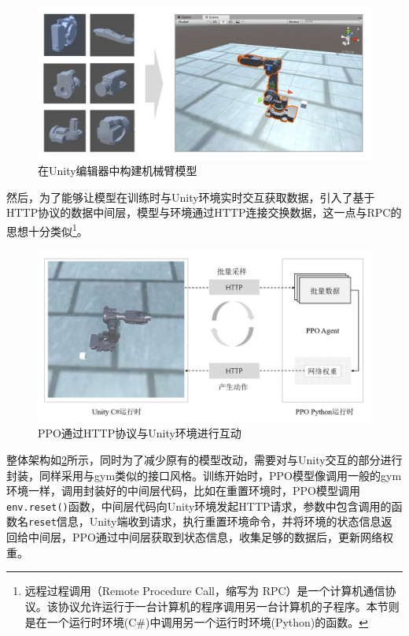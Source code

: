\documentclass[bachelor]{thesis-uestc}
\begin{document}
	\begin{figure}[]
		\includegraphics[width=14cm]{./pic/unity-arm-model.jpg}
		\caption{在Unity编辑器中构建机械臂模型}
		\label{pic:unity-arm-model}
	\end{figure}

	然后，为了能够让模型在训练时与Unity环境实时交互获取数据，引入了基于HTTP协议的数据中间层，模型与环境通过HTTP连接交换数据，这一点与RPC的思想十分类似\footnote{远程过程调用（Remote Procedure Call，缩写为 RPC）是一个计算机通信协议。该协议允许运行于一台计算机的程序调用另一台计算机的子程序。本节则是在一个运行时环境(C\#)中调用另一个运行时环境(Python)的函数。}。
	
	\begin{figure}[htbp]
		\includegraphics[width=14cm]{./pic/unity-ppo.jpg}
		\caption{PPO通过HTTP协议与Unity环境进行互动}
		\label{pic:unity-ppo}
	\end{figure}

	整体架构如\ref{pic:unity-ppo}所示，同时为了减少原有的模型改动，需要对与Unity交互的部分进行封装，同样采用与gym类似的接口风格。训练开始时，PPO模型像调用一般的gym环境一样，调用封装好的中间层代码，比如在重置环境时，PPO模型调用\lstinline|env.reset()|函数，中间层代码向Unity环境发起HTTP请求，参数中包含调用的函数名\lstinline|reset|信息，Unity端收到请求，执行重置环境命令，并将环境的状态信息返回给中间层，PPO通过中间层获取到状态信息，收集足够的数据后，更新网络权重。
	
\end{document}
